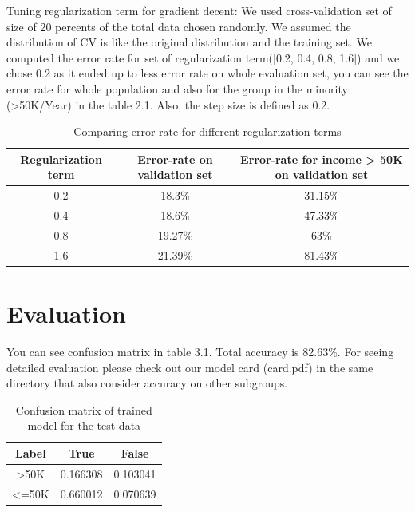 \documentclass[paper=a4, fontsize=11pt]{scrartcl}
\numberwithin{equation}{section}		%
\numberwithin{figure}{section}			%
\numberwithin{table}{section}				%
\begin{document}
Tuning regularization term for gradient decent:
We used cross-validation set of size of 20 percents of the total data chosen randomly. We assumed the distribution of CV is like the original distribution and the training set. We computed the error rate for set of regularization term([0.2, 0.4, 0.8, 1.6]) and we chose 0.2 as it ended up to less error rate on whole evaluation set, you can see the error rate for whole population and also for the group in the minority (>50K/Year) in the table 2.1. Also, the step size is defined as 0.2.


\begin{table}
\caption{Comparing error-rate for different regularization terms}
 \begin{tabular}{||c c c||} 
 \hline
 Regularization term & Error-rate on validation set & Error-rate for income > 50K on validation set  \\ [0.5ex] 
 \hline\hline
 0.2 & 18.3\% & 31.15\% \\
 \hline
 0.4 & 18.6\% & 47.33\% \\
 \hline
 0.8 & 19.27\% & 63\% \\
 \hline
 1.6 & 21.39\% & 81.43\%\\ [1ex] 
 \hline
\end{tabular}
\end{table}

\section{Evaluation}
You can see confusion matrix in table 3.1. Total accuracy is 82.63\%. For seeing detailed evaluation please check out our model card (card.pdf) in the same directory that also consider accuracy on other subgroups.

\begin{table}
\centering
\caption{Confusion matrix of trained model for the test data}
 \begin{tabular}{||c c c||} 
 \hline
 Label & True & False  \\ [0.5ex] 
 \hline\hline
 >50K & 0.166308 & 0.103041 \\
 \hline
 <=50K & 0.660012 & 0.070639 \\
 \hline
\end{tabular}
\end{table}

\end{document}
